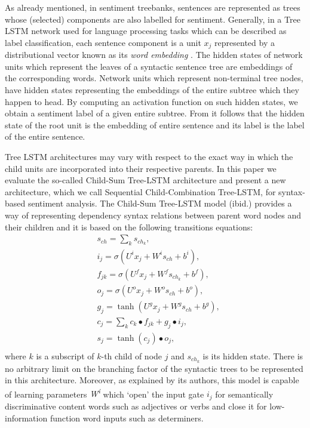 \documentclass[10pt, a4paper]{article}
\begin{document}
As already mentioned, in sentiment treebanks, sentences are represented as trees whose (selected) components are also labelled for sentiment. Generally, in a Tree LSTM network used for language processing tasks which can be described as label classification, each sentence component is a unit $x_j$ represented by a distributional vector known as its \textit{word embedding} \cite{mikolov2013distributed}. The hidden states of network units which represent the leaves of a syntactic sentence tree are embeddings of the corresponding words. Network units which represent non-terminal tree nodes, have hidden states representing the embeddings of the entire subtree which they happen to head. By computing an activation function on such hidden states, we obtain a sentiment label of a given entire subtree. From it follows that the hidden state of the root unit is the embedding of entire sentence and its label is the label of the entire sentence.
\par	Tree LSTM architectures may vary with respect to the exact way in which the child units are incorporated into their respective parents. In this paper we evaluate the so-called Child-Sum Tree-LSTM architecture \cite{tai2015improved} and present a new architecture, which we call  Sequential Child-Combination Tree-LSTM, for syntax-based sentiment analysis. The Child-Sum Tree-LSTM model (ibid.) provides a way of representing dependency syntax relations between parent word nodes and their children and it is based on the following transitions equations:
\begin{equation}
\begin{split}
&s_{ch}=\sum_{k}s_{ch_k},\\
&i_j = \sigma(U^ix_j + W^is_{ch} + b^i) ,\\
&f_{jk} = \sigma(U^fx_j + W^fs_{ch_k} + b^f) ,\\
&o_j = \sigma(U^ox_j + W^os_{ch} + b^o) ,\\
&g_j = \tanh(U^gx_j+ W^gs_{ch} + b^g) ,\\
&c_j = \sum_{k} c_k \bullet f_{jk} + g_{j} \bullet i_{j} ,\\
&s_j = \tanh({c_{j}}) \bullet o_{j},\\
\end{split}
\end{equation}
	where $k$ is a subscript of $k$-th child of node $j$ and $s_{ch_k}$ is its hidden state. There is no arbitrary limit on the branching factor of the syntactic trees to be represented in this architecture. Moreover, as explained by its authors, this model is capable of learning parameters \textit{W\textsuperscript{i}} which `open' the input gate \textit{$i_{j}$} for semantically discriminative content words such as adjectives or verbs and close it for low-information function word inputs such as determiners. 
\end{document}

